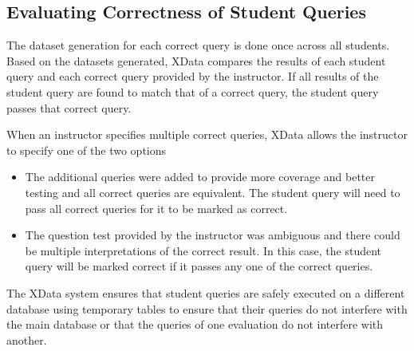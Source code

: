 \subsection{Evaluating Correctness of Student Queries}
The dataset generation for each correct query is done once across all students. Based on the datasets generated, XData compares the results of each student query and each correct query provided by the instructor. If all results of the student query are found to match that of a correct query, the student query passes that correct query.

When an instructor specifies multiple correct queries, XData allows the instructor to specify one of the two options 
\begin{itemize}
    \item The additional queries were added to provide more coverage and better testing and all correct queries are equivalent. The student query will need to pass all correct queries for it to be marked as correct. 
    \item The question test provided by the instructor was ambiguous and there could be multiple interpretations of the correct result. In this case, the student query will be marked correct if it passes any one of the correct queries. 
\end{itemize}

The XData system ensures that student queries are safely executed on a different database using temporary tables to ensure that their queries do not interfere with the main database or that the queries of one evaluation do not interfere with another. 
